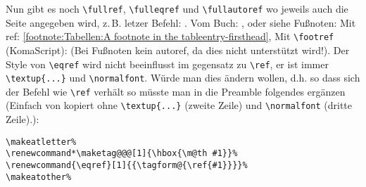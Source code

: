 Nun gibt es noch \verb|\fullref|, \verb|\fulleqref| und \verb|\fullautoref| wo jeweils auch die Seite angegeben wird, z.\,B. letzer Befehl: . Vom Buch: \cite{LabenbacherTeX}, oder siehe Fußnoten: Mit ref: \ref{footnote:Tabellen:A footnote in the tableentry-firsthead}, Mit \verb|\footref| (KomaScript):  (Bei Fußnoten kein autoref, da dies nicht unterstützt wird!). Der Style von \verb|\eqref| wird nicht beeinflusst im gegensatz zu \verb|\ref|, er ist immer \verb|\textup{...}| und \verb|\normalfont|. Würde man dies ändern wollen, d.h. so dass sich der Befehl wie \verb|\ref| verhält so müsste man in die Preamble folgendes ergänzen (Einfach von  kopiert ohne \verb|\textup{...}| (zweite Zeile) und \verb|\normalfont| (dritte Zeile).):%
\begin{lstlisting}[style=LaTeX, caption={\LaTeX-Code für \ldots{}.}, label={lst:introduction:3}]
\makeatletter%
\renewcommand*\maketag@@@[1]{\hbox{\m@th #1}}%
\renewcommand{\eqref}[1]{{\tagform@{\ref{#1}}}}%
\makeatother%
\end{lstlisting}



